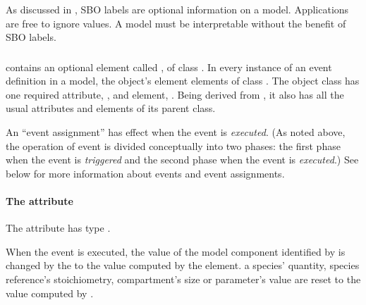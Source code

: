 As discussed in , SBO labels are optional
information on a model.  Applications are free to ignore
 values.  A model must be interpretable without the
benefit of SBO labels.


\subsubsection{}
\label{sec:eventassignment}
\label{sec:listofeventassignments}

\Event contains an optional element called
, of class \ListOfEventAssignments.
In every instance of an event definition in a model, the object's
 element   elements of class
\EventAssignment.  The object class \EventAssignment has one
required attribute, , and  element,
.  Being derived from \SBase, it also has all the
usual attributes and elements of its parent class.

An ``event assignment'' has effect when the event is
\emph{executed}.  (As noted above, the operation of event is
divided conceptually into two phases: the first phase when the
event is \emph{triggered} and the second phase when the event is
\emph{executed}.)  See  below for
more information about events and event assignments.


\paragraph{The  attribute}

The  attribute  has type . 

When the event is executed, the value of
the model component identified by  is changed by
the \EventAssignment to the value computed by the 
element.   a species' quantity, species reference's
stoichiometry, compartment's size or parameter's value are reset
to the value computed by .

